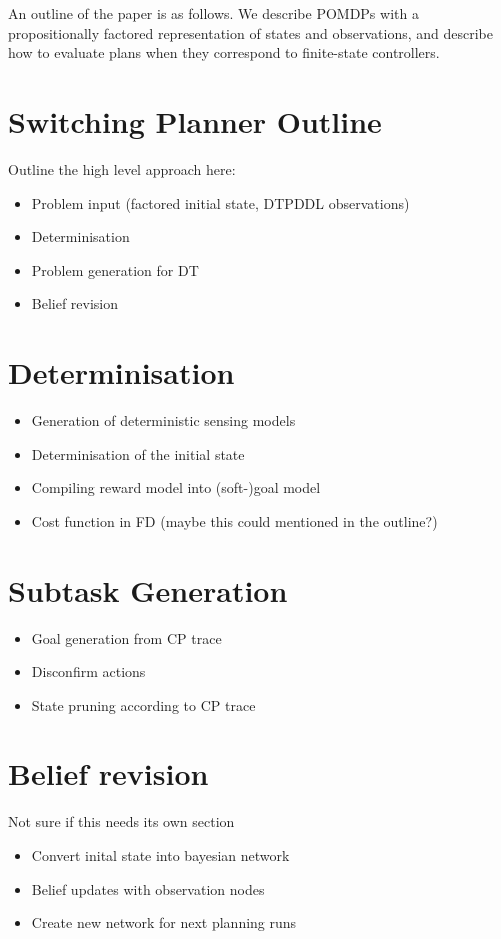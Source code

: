\documentclass[letterpaper]{article}
\begin{document}
An outline of the paper is as follows. We describe POMDPs with a
propositionally factored representation of states and observations,
and describe how to evaluate plans when they correspond to
finite-state controllers.

\section{Switching Planner Outline}

Outline the high level approach here:
\begin{itemize}
\item Problem input (factored initial state, DTPDDL observations)
\item Determinisation
\item Problem generation for DT
\item Belief revision
\end{itemize}

\section{Determinisation}

\begin{itemize}
\item Generation of deterministic sensing models
\item Determinisation of the initial state
\item Compiling reward model into (soft-)goal model
\item Cost function in FD (maybe this could mentioned in the outline?)
\end{itemize}

\section{Subtask Generation}
\begin{itemize}
\item Goal generation from CP trace
\item Disconfirm actions
\item State pruning according to CP trace
\end{itemize}

\section{Belief revision}
Not sure if this needs its own section
\begin{itemize}
\item Convert inital state into bayesian network
\item Belief updates with observation nodes
\item Create new network for next planning runs
\end{itemize}
\end{document}
